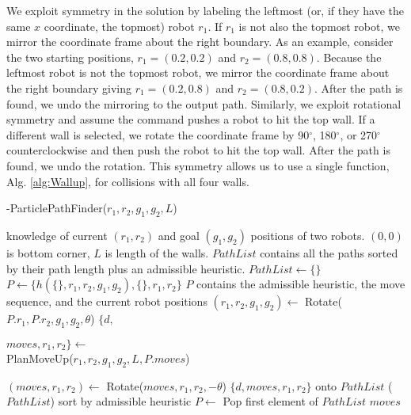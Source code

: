 We  exploit symmetry in the solution by labeling the leftmost (or, if they have the same $x$ coordinate, the topmost) robot $r_1$. 
 If $r_1$ is not also the topmost robot, we mirror the coordinate frame about the right boundary. 
 As an example, consider the two starting positions, $r_1 =  (0.2, 0.2) $ and $r_2 = (0.8, 0.8)$. 
  Because the leftmost robot is not the topmost robot, we mirror the coordinate frame about the right boundary giving $r_1 = (0.2, 0.8)$ and $r_2 = (0.8,0.2)$. 
 After the path is found, we undo the mirroring to the output path. 
  Similarly, we exploit rotational symmetry and assume the command pushes a robot to hit the top wall.
   If a different wall is selected, we rotate the coordinate frame by 90$^{\circ}$, 180$^{\circ}$, or 270$^{\circ}$ counterclockwise and then push the robot to hit the top wall.  After the path is found, we undo the rotation. 
   This symmetry allows us to use a single function, Alg. \ref{alg:Wallup},  for collisions with all four walls. 

\begin{algorithm}[htb]
\caption{ { -ParticlePathFinder}($r_1,r_2,g_1,g_2,L$)}\label{alg:optimalAlg}
\begin{algorithmic}[1]
\Require knowledge of current $(r_1,r_2)$ and goal $(g_1,g_2)$ positions of  two robots. 
$(0,0)$ is bottom corner,
 $L$ is length of the walls. 
 $PathList$ contains all the paths sorted by their path length plus an admissible heuristic. 
 \State  $PathList \gets \{\}$
 \State $P \gets   \{ h(\{\},r_1,r_2,g_1,g_2  ) ,\{\},r_1,r_2\} $ \Comment $P$ contains the admissible heuristic, the move sequence, and the current robot positions
\State $(r_1,r_2,g_1,g_2) \gets$ {\sc Rotate}($P.r_1,P.r_2,g_1,g_2,\theta$)
\State $\{d, $ \parbox[t]{.3\linewidth}{%
 $moves, r_1,r_2\} \gets$\\
 {\sc  PlanMoveUp}($r_1,r_2,g_1,g_2,L, P.moves$)}
\State $(moves, r_1,r_2) \gets$ {\sc Rotate}($moves, r_1,r_2,-\theta$)
 $\{d, moves, r_1,r_2\} $ onto $PathList$
\EndFor
{}($PathList$) \Comment sort by admissible heuristic
\State $P \gets $ {\sc Pop} first element of $PathList$
\EndWhile
\State \Return $moves$
\end{algorithmic}
\end{algorithm}


